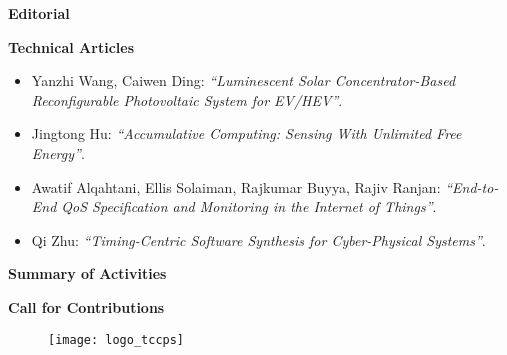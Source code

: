 {
\setlength{\parskip}{.2in}

\textbf{Editorial}

\textbf{Technical Articles}
\vspace{-.2in}
\begin{itemize}
    \item Yanzhi Wang, Caiwen Ding: 
    \textit{``Luminescent Solar Concentrator-Based Reconfigurable Photovoltaic System for EV/HEV''}.
    \item Jingtong Hu:
    \textit{``Accumulative Computing: Sensing With Unlimited Free Energy''}.
    \item Awatif Alqahtani, Ellis Solaiman, Rajkumar Buyya, Rajiv Ranjan:
    \textit{``End-to-End QoS Specification and Monitoring in the Internet of Things''}.
    \item Qi Zhu:
    \textit{``Timing-Centric Software Synthesis for Cyber-Physical Systems''}.
\end{itemize}

\textbf{Summary of Activities}

\textbf{Call for Contributions}

}


\begin{figure}[b!]
  \centering
  \texttt{[image: logo\_tccps]}
  \caption*{}
\end{figure}


